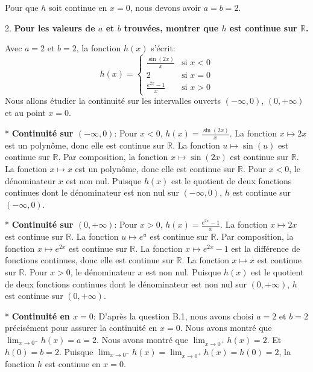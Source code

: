 \documentclass[12pt,a4paper]{report}
\begin{document}
    Pour que $h$ soit continue en $x=0$, nous devons avoir $a = b = 2$.

2.  \textbf{Pour les valeurs de $a$ et $b$ trouvées, montrer que $h$ est continue sur $\mathbb{R}$.}

    Avec $a=2$ et $b=2$, la fonction $h(x)$ s'écrit:
    $$ h(x) = \begin{cases} \frac{\sin(2x)}{x} & \text{si } x < 0 \\ 2 & \text{si } x = 0 \\ \frac{e^{2x} - 1}{x} & \text{si } x > 0 \end{cases} $$
    Nous allons étudier la continuité sur les intervalles ouverts $(-\infty, 0)$, $(0, +\infty)$ et au point $x=0$.

    *   \textbf{Continuité sur $(-\infty, 0)$}:
        Pour $x < 0$, $h(x) = \frac{\sin(2x)}{x}$.
        La fonction $x \mapsto 2x$ est un polynôme, donc elle est continue sur $\mathbb{R}$.
        La fonction $u \mapsto \sin(u)$ est continue sur $\mathbb{R}$.
        Par composition, la fonction $x \mapsto \sin(2x)$ est continue sur $\mathbb{R}$.
        La fonction $x \mapsto x$ est un polynôme, donc elle est continue sur $\mathbb{R}$.
        Pour $x < 0$, le dénominateur $x$ est non nul.
        Puisque $h(x)$ est le quotient de deux fonctions continues dont le dénominateur est non nul sur $(-\infty, 0)$, $h$ est continue sur $(-\infty, 0)$.

    *   \textbf{Continuité sur $(0, +\infty)$}:
        Pour $x > 0$, $h(x) = \frac{e^{2x} - 1}{x}$.
        La fonction $x \mapsto 2x$ est continue sur $\mathbb{R}$.
        La fonction $u \mapsto e^u$ est continue sur $\mathbb{R}$.
        Par composition, la fonction $x \mapsto e^{2x}$ est continue sur $\mathbb{R}$.
        La fonction $x \mapsto e^{2x} - 1$ est la différence de fonctions continues, donc elle est continue sur $\mathbb{R}$.
        La fonction $x \mapsto x$ est continue sur $\mathbb{R}$.
        Pour $x > 0$, le dénominateur $x$ est non nul.
        Puisque $h(x)$ est le quotient de deux fonctions continues dont le dénominateur est non nul sur $(0, +\infty)$, $h$ est continue sur $(0, +\infty)$.

    *   \textbf{Continuité en $x=0$}:
        D'après la question B.1, nous avons choisi $a=2$ et $b=2$ précisément pour assurer la continuité en $x=0$.
        Nous avons montré que $\lim_{x \to 0^-} h(x) = a = 2$.
        Nous avons montré que $\lim_{x \to 0^+} h(x) = 2$.
        Et $h(0) = b = 2$.
        Puisque $\lim_{x \to 0^-} h(x) = \lim_{x \to 0^+} h(x) = h(0) = 2$, la fonction $h$ est continue en $x=0$.
\end{document}
